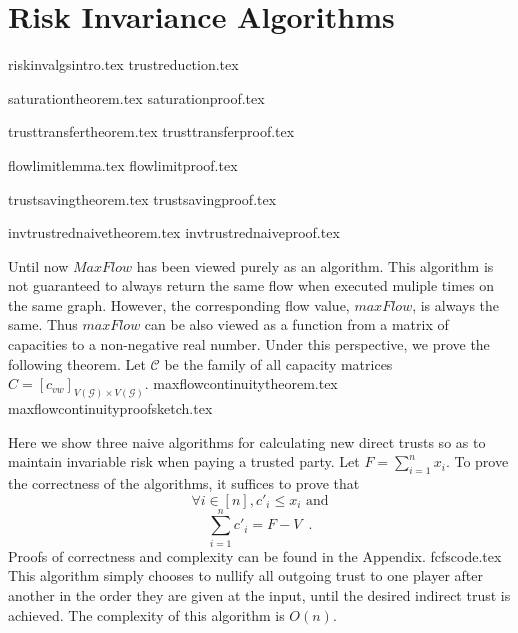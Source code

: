 \section{Risk Invariance Algorithms}
  {riskinvalgsintro.tex}
  {trustreduction.tex}

  {saturationtheorem.tex}
  {saturationproof.tex}

  {trusttransfertheorem.tex}
  {trusttransferproof.tex}

  {flowlimitlemma.tex}
  {flowlimitproof.tex}

  {trustsavingtheorem.tex}
  {trustsavingproof.tex}

  {invtrustrednaivetheorem.tex}
  {invtrustrednaiveproof.tex}

  Until now $MaxFlow$ has been viewed purely as an algorithm. This algorithm is not guaranteed to always return the same
  flow when executed muliple times on the same graph. However, the corresponding flow value, $maxFlow$, is always the same.
  Thus $maxFlow$ can be also viewed as a function from a matrix of capacities to a non-negative real number. Under this
  perspective, we prove the following theorem. Let $\mathcal{C}$ be the family of all capacity matrices
  $C = [c_{vw}]_{V\left(\mathcal{G}\right) \times V\left(\mathcal{G}\right)}$.
  {maxflowcontinuitytheorem.tex}
  {maxflowcontinuityproofsketch.tex}

  Here we show three naive algorithms for calculating new direct trusts so as to maintain invariable risk when paying
  a trusted party. Let $F = \sum\limits_{i=1}^{n}x_i$. To prove the correctness of the algorithms, it suffices to prove that
  \begin{equation}
  \label{naive:req1}
     \forall i \in [n], c'_i \leq x_i \mbox{ and}
  \end{equation}
  \begin{equation}
  \label{naive:req2}
     \sum\limits_{i=1}^{n}c'_i = F - V \enspace.
  \end{equation}
  Proofs of correctness and complexity can be found in the Appendix.
  \newpage
  {fcfscode.tex}
  This algorithm simply chooses to nullify all outgoing trust to one player after another in the order they are given at the
  input, until the desired indirect trust is achieved. The complexity of this algorithm is $O\left(n\right)$.

